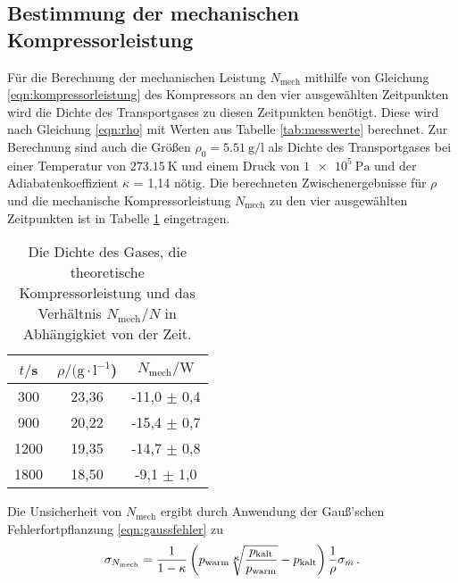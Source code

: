 \subsection{Bestimmung der mechanischen Kompressorleistung}
Für die Berechnung der mechanischen Leistung $N_\text{mech}$ mithilfe von Gleichung
\eqref{eqn:kompressorleistung} des Kompressors an den vier ausgewählten Zeitpunkten
wird die Dichte des Transportgases zu diesen Zeitpunkten benötigt.
Diese wird nach Gleichung \eqref{eqn:rho} mit Werten aus Tabelle \ref{tab:messwerte}
berechnet.
Zur Berechnung sind auch die Größen $\rho_0 = \SI{5.51}{\gram\per\litre}$ als Dichte
des Transportgases bei einer Temperatur von $\SI{273.15}{\kelvin}$ und einem Druck von
$\SI{1e5}{\pascal}$ und der Adiabatenkoeffizient $\kappa$ = 1,14 nötig.
Die berechneten Zwischenergebnisse für $\rho$ und die mechanische Kompressorleistung
$N_\text{mech}$ zu den vier ausgewählten Zeitpunkten ist in Tabelle \ref{tab:datalast}
eingetragen.

\begin{table}
	\centering
	\caption{Die Dichte des Gases, die theoretische Kompressorleistung und das Verhältnis $N_\text{mech}/N$ in Abhängigkiet von der Zeit.}
  \label{tab:datalast}
	\begin{tabular}{ccc}
		\toprule
		$t/$s & $\rho/(\text{g} \cdot \text{l}^{-1}$) & $N_\text{mech} / \text{W}$ \\
    \midrule
		300 & 23,36 & -11,0 $\pm$ 0,4 \\
		900 & 20,22 & -15,4 $\pm$ 0,7 \\
	  1200 & 19,35 & -14,7 $\pm$ 0,8 \\
		1800 & 18,50 & -9,1 $\pm$ 1,0 \\
		\bottomrule
	\end{tabular}
\end{table}

Die Unsicherheit von $N_\text{mech}$ ergibt durch Anwendung der Gauß'schen Fehlerfortpflanzung
\eqref{eqn:gaussfehler} zu
\begin{equation}
  \sigma_{N_\text{mech}} = \frac{1}{1 - \kappa} \left(p_\text{warm} \sqrt[\leftroot{-1}\uproot{-1}\scriptstyle \kappa]{\frac{p_\text{kalt}}{p_\text{warm}}} - p_\text{kalt} \right) \frac{1}{\rho} \sigma_{\dot{m}}\,.
\end{equation}
